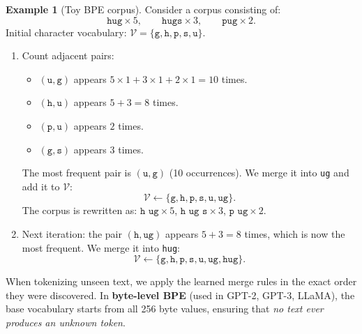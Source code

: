 \documentclass[11pt,a4paper]{article}
\theoremstyle{definition}
\newtheorem{example}[definition]{Example}
\theoremstyle{plain}
\begin{document}
\begin{example}[Toy BPE corpus]\label{ex:bpe}
Consider a corpus consisting of:
\begin{equation*}
\texttt{hug} \times 5, \qquad \texttt{hugs} \times 3, \qquad \texttt{pug} \times 2.
\end{equation*}
Initial character vocabulary: $\mathcal{V} = \{\texttt{g}, \texttt{h}, \texttt{p}, \texttt{s}, \texttt{u}\}$.
\begin{enumerate}
\item Count adjacent pairs:
\begin{itemize}[nosep]
\item $(\texttt{u}, \texttt{g})$ appears $5 \times 1 + 3 \times 1 + 2 \times 1 = 10$ times.
\item $(\texttt{h}, \texttt{u})$ appears $5 + 3 = 8$ times.
\item $(\texttt{p}, \texttt{u})$ appears $2$ times.
\item $(\texttt{g}, \texttt{s})$ appears $3$ times.
\end{itemize}
The most frequent pair is $(\texttt{u}, \texttt{g})$ (10 occurrences). We merge it into \texttt{ug} and add it to $\mathcal{V}$:
\begin{equation*}
\mathcal{V} \leftarrow \{\texttt{g}, \texttt{h}, \texttt{p}, \texttt{s}, \texttt{u}, \texttt{ug}\}.
\end{equation*}
The corpus is rewritten as: $\texttt{h ug} \times 5$, $\texttt{h ug s} \times 3$, $\texttt{p ug} \times 2$.
\item Next iteration: the pair $(\texttt{h}, \texttt{ug})$ appears $5 + 3 = 8$ times, which is now the most frequent. We merge it into \texttt{hug}:
\begin{equation*}
\mathcal{V} \leftarrow \{\texttt{g}, \texttt{h}, \texttt{p}, \texttt{s}, \texttt{u}, \texttt{ug}, \texttt{hug}\}.
\end{equation*}
\end{enumerate}
When tokenizing unseen text, we apply the learned merge rules in the exact order they were discovered. In \textbf{byte-level BPE} (used in GPT-2, GPT-3, LLaMA), the base vocabulary starts from all 256 byte values, ensuring that \emph{no text ever produces an unknown token}.
\end{example}
\end{document}
